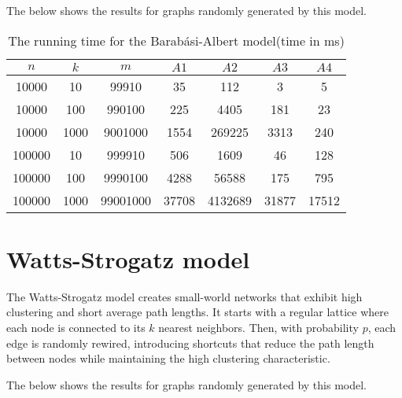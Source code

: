 The  below shows the results for graphs randomly generated by this model. 
\begin{center}
\begin{table}[]
    \centering
    \begin{tabular}[
    caption = {Barabasi-Albert model},
    label = {tbl:barabasi_albert},
  ]{ | c | c | c | c | c | c | c | }
  \hline
   $n$ & $k$ & $m$ & $A1$ & $A2$ & $A3$ & $A4$ \\ [0.5ex] 
  \hline\hline
   10000 & 10 & 99910 & 35 & 112 & 3 & 5 \\
  \hline
 10000 & 100 & 990100 & 225 & 4405 & 181 & 23 \\
\hline
 10000 & 1000 & 9001000 & 1554 & 269225 & 3313 & 240 \\
\hline
 100000 & 10 & 999910 & 506 & 1609 & 46 & 128 \\
\hline
 100000 & 100 & 9990100 & 4288 & 56588 & 175 & 795 \\
\hline
 100000 & 1000 & 99001000 & 37708 & 4132689 & 31877 & 17512 \\
  \hline
  \end{tabular}
  \caption{The running time for the Barab\'asi-Albert model(time in ms)}
    \label{tab:barabasi_albert}
\end{table}
  \end{center}

\section{Watts-Strogatz model}
The Watts-Strogatz model creates small-world networks that exhibit high clustering and short average path lengths. It starts with a regular lattice where each node is connected to its 
$k$ nearest neighbors. Then, with probability 
$p$, each edge is randomly rewired, introducing shortcuts that reduce the path length between nodes while maintaining the high clustering characteristic. 

The  below shows the results for graphs randomly generated by this model. 


